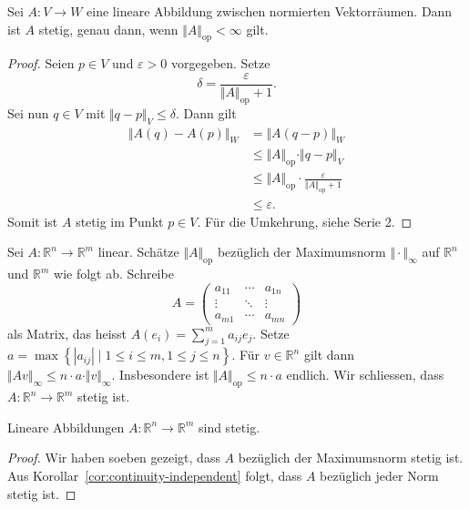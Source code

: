 \documentclass[../main.tex]{subfiles}
\begin{document}
\begin{proposition}
  Sei $A \colon V \to W$ eine lineare Abbildung zwischen
  normierten Vektorräumen.
  Dann ist $A$ stetig, genau dann, wenn
  $\Vert A \Vert_\text{op} < \infty$ gilt.
\end{proposition}

\begin{proof}
Seien $p \in V$ und $\varepsilon > 0$
vorgegeben.
Setze
\[
  \delta = \frac{\varepsilon}{\Vert A \Vert_{\text{op}} + 1}.
\]
Sei nun $q \in V$ mit $\Vert q - p \Vert_V \leq \delta$.
Dann gilt
\begin{align*}
  \Vert A(q) - A(p) \Vert_W
  & = \Vert A(q- p)\Vert_W\\
  &\leq \Vert A \Vert_\text{op} \cdot \Vert q - p \Vert_V \\
  & \leq \Vert A \Vert_{\text{op}} \cdot
  \frac{\varepsilon}{\Vert A \Vert_{\text{op}} + 1} \\
  &\leq \varepsilon.
\end{align*}
Somit ist $A$ stetig im Punkt $p \in V$.
Für die Umkehrung, siehe Serie 2.
\end{proof}

\begin{specialcase}
  Sei $A \colon \mathbb{R}^n \to \mathbb{R}^m$ linear.
  Schätze $\Vert A \Vert_{\text{op}}$ bezüglich
  der Maximumsnorm $\Vert \cdot \Vert_{\infty}$ auf
  $\mathbb{R}^n$ und $\mathbb{R}^m$ wie folgt ab.
  Schreibe
  \[
    A =
    \begin{pmatrix}
      a_{11} & \cdots & a_{1n} \\
      \vdots & \ddots & \vdots \\
      a_{m1} & \cdots & a_{mn}
    \end{pmatrix}
  \]
  als Matrix, das heisst $A(e_i) = \sum_{j=1}^{m} a_{ij}e_j$.
  Setze $a = \max \left\{|a_{ij}| \mid
  1 \leq i \leq m, 1 \leq j \leq n\right\}$.
  Für $v \in \mathbb{R}^{n}$ gilt dann
  \(
    \Vert Av \Vert_\infty \leq n \cdot a \cdot \Vert v \Vert_{\infty}.
  \)
  Insbesondere ist $\Vert A \Vert_{\text{op}} \leq n \cdot a$ endlich.
  Wir schliessen, dass $A \colon \mathbb{R}^n \to \mathbb{R}^m$ stetig ist.
\end{specialcase}

\begin{corollary}
  Lineare Abbildungen $A \colon \mathbb{R}^n \to \mathbb{R}^m$ sind stetig.
\end{corollary}

\begin{proof}
  Wir haben soeben gezeigt, dass $A$ bezüglich der Maximumsnorm stetig ist.
  Aus Korollar~\ref{cor:continuity-independent} folgt, dass
  $A$ bezüglich jeder Norm stetig ist.
\end{proof}
\end{document}

